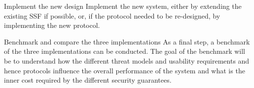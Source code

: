 \documentclass[E]{BAMASA}
\begin{document}
\begin{workpackage}{Implement the new design}\label{wp:new-design}
    Implement the new system, either by extending the existing SSF if possible, or,
    if the protocol needed to be re-designed, by implementing the new protocol.
\end{workpackage}

\begin{workpackage}{Benchmark and compare the three implementations}\label{wp:new-implementation}
    As a final step, a benchmark of the three implementations can be conducted.
    The goal of the benchmark will be to understand how the different threat models
    and usability requirements and hence protocols influence the overall performance
    of the system and what is the inner cost required by the different security guarantees.
\end{workpackage}


\gradingMA





\end{document}
